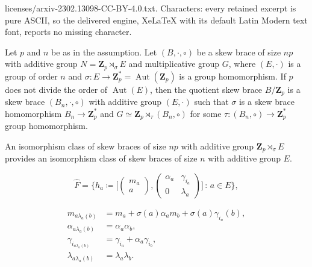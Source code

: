 \documentclass[10pt,a4paper]{amsart}
\newcommand{\Aut}{\operatorname{Aut}}
\newcommand{\Z}{\mathbf Z}
\begin{document}
licenses/arxiv-2302.13098-CC-BY-4.0.txt. Characters: every retained excerpt is pure ASCII, so the delivered engine, XeLaTeX with its default Latin Modern text font, reports no missing character.
	\begin{theorem}\label{npgivesn} Let $p$ and $n$ be as in the assumption. Let $(B,\cdot,\circ)$ be a skew brace of size $np$ with additive group $N=\Z_p\rtimes_{\sigma} E$ and multiplicative group $G$, where $(E,\cdot)$ is a group of order $n$ and $\sigma: E\to \Z_p^*=\Aut(\Z_p)$ is a group homomorphism. If $p$ does not divide the order of $\Aut(E)$, then 
		the quotient skew brace $B/\Z_p$ is a skew brace $(B_n, \cdot,\circ)$ with additive group $(E,\cdot)$ such that $\sigma$ is a skew brace homomorphism $B_n\to \Z_p^*$ and $G\simeq \Z_p\rtimes_{\tau} (B_n,\circ)$ for some $\tau: (B_n,\circ)\to \Z_p^*$ group homomorphism. 
		
		An isomorphism class of skew braces of size $np$ with additive group $\Z_p\rtimes_{\sigma} E$ provides an isomorphism class of skew braces of size $n$ with additive group $E$.
	\end{theorem}

\begin{equation}\label{F}		
\hat F=\Big\{ h_a\coloneqq\Big[\begin{pmatrix}
		m_a\\
		a
		\end{pmatrix},\begin{pmatrix}
		\alpha_a & \gamma_{i_a}\\
		0&\lambda_a
		\end{pmatrix}\Big] \, : \, a \in E\Big\},
\end{equation}

\begin{align}
m_{a\lambda_a(b)}&=m_a+\sigma(a)\alpha_am_b+\sigma(a)\gamma_{i_a}(b),\label{sgc1}\\
\alpha_{a\lambda_a(b)}&=\alpha_a\alpha_b,\\
\gamma_{i_{a\lambda_a(b)}}&=\gamma_{i_a}+\alpha_a\gamma_{i_b}, \label{sgc3} \\
\lambda_{a\lambda_a(b)}&=\lambda_a\lambda_b. \label{sgc4}
\end{align}
\end{document}
